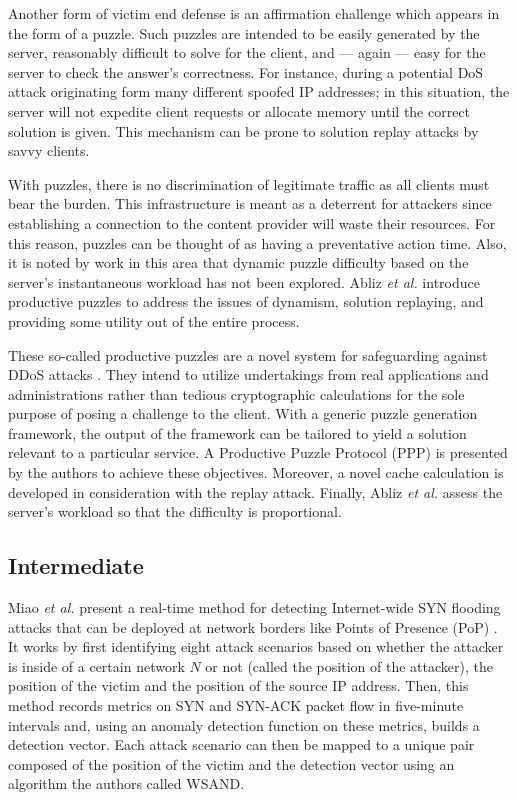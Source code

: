 \documentclass[conference]{IEEEtran}
\begin{document}
Another form of victim end defense is an affirmation challenge which appears in the form of a puzzle. Such puzzles are intended to be easily generated by the server, reasonably difficult to solve for the client, and --- again --- easy for the server to check the answer's correctness. For instance, during a potential DoS attack originating form many different spoofed IP addresses; in this situation, the server will not expedite client requests or allocate memory until the correct solution is given. This mechanism can be prone to solution replay attacks by savvy clients.

With puzzles, there is no discrimination of legitimate traffic as all clients must bear the burden. This infrastructure is meant as a deterrent for attackers since establishing a connection to the content provider will waste their resources. For this reason, puzzles can be thought of as having a preventative action time. Also, it is noted by work in this area that dynamic puzzle difficulty based on the server's instantaneous workload has not been explored. Abliz \textit{et al.} introduce productive puzzles to address the issues of dynamism, solution replaying, and providing some utility out of the entire process. 

These so-called productive puzzles are a novel system for safeguarding against DDoS attacks \cite{Abliz:Puzz}. They intend to utilize undertakings from real applications and administrations rather than tedious cryptographic calculations for the sole purpose of posing a challenge to the client. With a generic puzzle generation framework, the output of the framework can be tailored to yield a solution relevant to a particular service. A Productive Puzzle Protocol (PPP) is presented by the authors to achieve these objectives. Moreover, a novel cache calculation is developed in consideration with the replay attack. Finally, Abliz \textit{et al.} assess the server's workload so that the difficulty is proportional. 

\subsection{Intermediate}
Miao \textit{et al.} present a real-time method for detecting Internet-wide SYN flooding attacks that can be deployed at network borders like Points of Presence (PoP) \cite{RealtimeDetection:Miao}. It works by first identifying eight attack scenarios based on whether the attacker is inside of a certain network $N$ or not (called the position of the attacker), the position of the victim and the position of the source IP address. Then, this method records metrics on SYN and SYN-ACK packet flow in five-minute intervals and, using an anomaly detection function on these metrics, builds a detection vector. Each attack scenario can then be mapped to a unique pair composed of the position of the victim and the detection vector using an algorithm the authors called WSAND.
\end{document}
